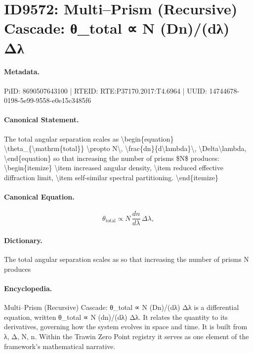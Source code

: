\section*{ID9572: Multi–Prism (Recursive) Cascade: θ\_total ∝ N (Dn)/(dλ) Δλ}
\paragraph{Metadata.}
PiID: 8690507643100 | RTEID: RTE:P37170.2017:T4.6964 | UUID: 14744678-0198-5e99-9558-e0e15c3485f6

\paragraph{Canonical Statement.}
The total angular separation scales as \textbackslash{}begin\{equation\} \textbackslash{}theta\_\{\textbackslash{}mathrm\{total\}\} \textbackslash{}propto N\textbackslash{}, \textbackslash{}frac\{dn\}\{d\textbackslash{}lambda\}\textbackslash{}, \textbackslash{}Delta\textbackslash{}lambda, \textbackslash{}end\{equation\} so that increasing the number of prisms \$N\$ produces: \textbackslash{}begin\{itemize\} \textbackslash{}item increased angular density, \textbackslash{}item reduced effective diffraction limit, \textbackslash{}item self-similar spectral partitioning. \textbackslash{}end\{itemize\}

\paragraph{Canonical Equation.}
\[
\theta_{\mathrm{total}} \propto N\, \frac{dn}{d\lambda}\, \Delta\lambda,
\]

\paragraph{Dictionary.}
The total angular separation scales as so that increasing the number of prisms N produces

\paragraph{Encyclopedia.}
Multi–Prism (Recursive) Cascade: θ\_total ∝ N (Dn)/(dλ) Δλ is a differential equation, written θ\_total ∝ N (dn)/(dλ) Δλ. It relates the quantity to its derivatives, governing how the system evolves in space and time. It is built from λ, Δ, N, n. Within the Trawin Zero Point registry it serves as one element of the framework's mathematical narrative.
